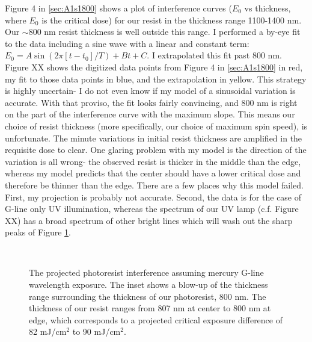 Figure 4 in \ref{sec:A1s1800} shows a plot of interference curves ($E_0$ vs thickness, where $E_0$ is the critical dose) for our resist in the thickness range 1100-1400 nm.  Our $\sim$800 nm resist thickness is well outside this range.  I performed a by-eye fit to the data including a sine wave with a linear and constant term: $E_0=A\sin(2\pi [t-t_0]/T) + Bt+C$.  I extrapolated this fit past 800 nm.  Figure XX shows the digitized data points from Figure 4 in \ref{sec:A1s1800} in red, my fit to those data points in blue, and the extrapolation in yellow.  This strategy is highly uncertain- I do not even know if my model of a sinusoidal variation is accurate.  With that proviso, the fit looks fairly convincing, and 800 nm is right on the part of the interference curve with the maximum slope.  This means our choice of resist thickness (more specifically, our choice of maximum spin speed), is unfortunate.  The minute variations in initial resist thickness are amplified in the requisite dose to clear.  One glaring problem with my model is the direction of the variation is all wrong- the observed resist is thicker in the middle than the edge, whereas my model predicts that the center should have a lower critical dose and therefore be thinner than the edge.  There are a few places why this model failed.  First, my projection is probably not accurate.  Second, the data is for the case of G-line only UV illumination, whereas the spectrum of our UV lamp (c.f. Figure XX) has a broad spectrum of other bright lines which will wash out the sharp peaks of Figure \ref{fig:S1800interference}.   

\begin{figure}
\begin{center}

\\
\caption[Projected photoresist interference]{The projected photoresist interference assuming mercury G-line wavelength exposure.  The inset shows a blow-up of the thickness range surrounding the thickness of our photoresist, 800 nm.  The thickness of our resist ranges from 807 nm at center to 800 nm at edge, which corresponds to a projected critical exposure difference of 82 mJ/cm$^2$ to 90 mJ/cm$^2$.}
\label{fig:S1800interference}
\end{center}
\end{figure}

